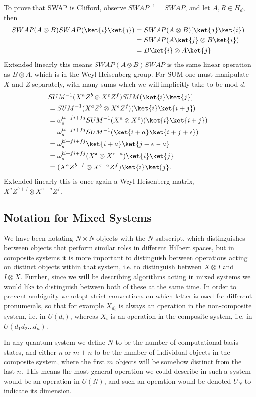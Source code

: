 To prove that SWAP is Clifford, observe $SWAP^{-1} = SWAP$, and let $A, B \in H_d$, then
\begin{align*}
SWAP (A \otimes B) SWAP (\ket{i}\ket{j})
&= SWAP (A \otimes B)(\ket{j}\ket{i})
\\&=SWAP (A\ket{j} \otimes B\ket{i})
\\&=B\ket{i} \otimes A\ket{j}
\end{align*}
Extended linearly this means $SWAP (A \otimes B) SWAP$ is the same linear operation as $B \otimes A$, which is in the Weyl-Heisenberg group. For SUM one must manipulate $X$ and $Z$ separately, with many sums which we will implicitly take to be mod $d$.
\begin{align*}
&SUM^{-1} (X^aZ^b \otimes X^eZ^f) SUM (\ket{i}\ket{j})
\\&=SUM^{-1} (X^aZ^b \otimes X^eZ^f) (\ket{i}\ket{i+j})
\\&=\omega_d^{bi+fi+fj}SUM^{-1}(X^a \otimes X^e) (\ket{i}\ket{i+j})
\\&=\omega_d^{bi+fi+fj}SUM^{-1} (\ket{i+a}\ket{i+j+e})
\\&=\omega_d^{bi+fi+fj}\ket{i+a}\ket{j+e-a}
\\&=\omega_d^{bi+fi+fj}(X^a \otimes X^{e-a})\ket{i}\ket{j}
\\&=(X^aZ^{b+f} \otimes X^{e-a}Z^f)\ket{i}\ket{j}.
\end{align*}
Extended linearly this is once again a Weyl-Heisenberg matrix, $X^aZ^{b+f} \otimes X^{e-a}Z^f$.

\subsection{Notation for Mixed Systems}\label{notation}
We have been notating $N \times N$ objects with the $N$ subscript, which distinguishes between objects that perform similar roles in different Hilbert spaces, but in composite systems it is more important to distinguish between operations acting on distinct objects within that system, i.e. to distinguish between $X \otimes I$ and $I \otimes X$. Further, since we will be describing algorithms acting in mixed systems we would like to distinguish between both of these at the same time. In order to prevent ambiguity we adopt strict conventions on which letter is used for different pronumerals, so that for example $X_{d_i}$ is always an operation in the non-composite system, i.e. in $U(d_i)$, whereas $X_i$ is an operation in the composite system, i.e. in $U(d_1d_2\dots d_n)$.

In any quantum system we define $N$ to be the number of computational basis states, and either $n$ or $m+n$ to be the number of individual objects in the composite system, where the first $m$ objects will be somehow distinct from the last $n$. This means the most general operation we could describe in such a system would be an operation in $U(N)$, and such an operation would be denoted $U_N$ to indicate its dimension.

